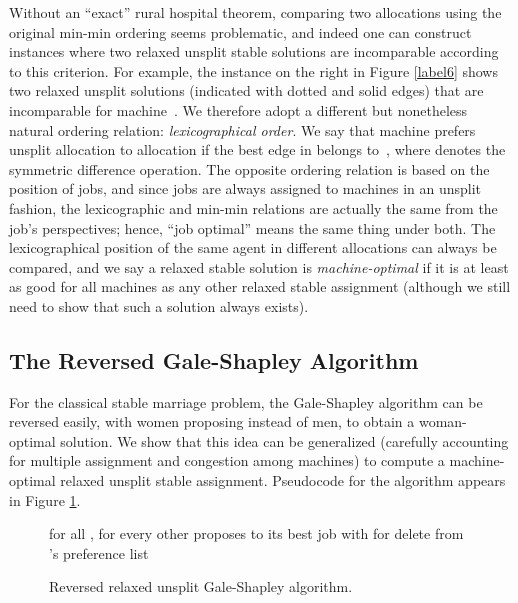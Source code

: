 \documentclass{llncs}
\newcommand{\mycaption}[2]
 {\begin{center} \parbox{4in}{\caption{\small #2 \label{#1}}} \end{center}}
\begin{document}
Without an ``exact'' rural hospital theorem, comparing two allocations
using the original min-min ordering seems problematic, and indeed one
can construct instances where two relaxed unsplit stable solutions are
incomparable according to this criterion.  For example, the instance
on the right in Figure \ref{label6} shows two relaxed unsplit
solutions (indicated with dotted and solid edges) that are
incomparable for machine~. We therefore adopt a different but
nonetheless natural ordering relation: \emph{lexicographical
  order}. We say that machine  prefers unsplit allocation  to
allocation  if the best edge in  belongs
to~, where  denotes the symmetric difference
operation.  The opposite ordering relation is based on the position of
jobs, and since jobs are always assigned to machines in an unsplit
fashion, the lexicographic and min-min relations are actually the same
from the job's perspectives; hence, ``job optimal'' means the same
thing under both.  The lexicographical position of the same agent in
different allocations can always be compared, and we say a relaxed
stable solution  is \emph{machine-optimal} if it is at least as
good for all machines as any other relaxed stable assignment (although
we still need to show that such a solution always exists).

\subsection{The Reversed Gale-Shapley Algorithm}

For the classical stable marriage problem, the Gale-Shapley algorithm
can be reversed easily, with women proposing instead of men, to obtain
a woman-optimal solution.  We show that this idea can be generalized
(carefully accounting for multiple assignment and congestion among
machines) to compute a machine-optimal relaxed unsplit stable
assignment.  Pseudocode for the algorithm appears in Figure \ref{rev_gs}.

\begin{figure}[t]
\begin{center}
\begin{algorithmic}[1]
	\State  for all ,  for every other  
		\State  proposes to its best job  with 
			\State 
			\State  for 
		\EndIf
			\State delete  from 's preference list
	\EndWhile
\end{algorithmic}
\vspace*{-0.1in}
\end{center}
\mycaption{rev_gs}{Reversed relaxed unsplit Gale-Shapley algorithm.}
\end{figure}
\end{document}
